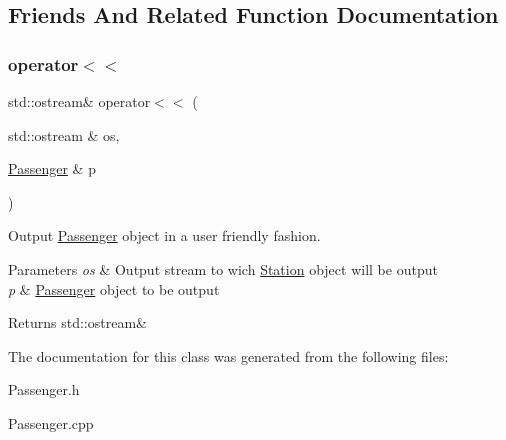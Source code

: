 \subsection{Friends And Related Function Documentation}
\mbox{\label{classPassenger_a7b1aeaded08562578690b788f39db888}} 
\subsubsection{\texorpdfstring{operator$<$$<$}{operator<<}}
{\footnotesize\ttfamily std\+::ostream\& operator$<$$<$ (\begin{DoxyParamCaption}\item[{std\+::ostream \&}]{os,  }\item[{\mbox{\hyperlink{classPassenger}{Passenger}} \&}]{p }\end{DoxyParamCaption})\hspace{0.3cm}{\ttfamily [friend]}}



Output \mbox{\hyperlink{classPassenger}{Passenger}} object in a user friendly fashion. 


\begin{DoxyParams}{Parameters}
{\em os} & Output stream to wich \mbox{\hyperlink{classStation}{Station}} object will be output \\
\hline
{\em p} & \mbox{\hyperlink{classPassenger}{Passenger}} object to be output \\
\hline
\end{DoxyParams}
\begin{DoxyReturn}{Returns}
std\+::ostream\& 
\end{DoxyReturn}


The documentation for this class was generated from the following files\+:\begin{DoxyCompactItemize}
\item 
Passenger.\+h\item 
Passenger.\+cpp\end{DoxyCompactItemize}
